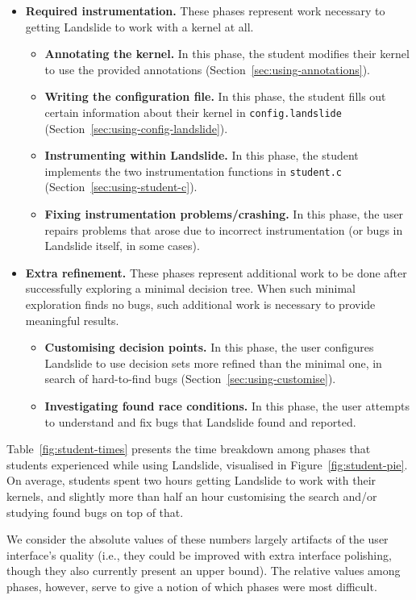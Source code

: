 {\begin{itemize}
	\item {\bf Required instrumentation.} These phases represent work necessary to getting Landslide to work with a kernel at all.
	\begin{itemize}
		\item {\bf Annotating the kernel.} In this phase, the student modifies their kernel to use the provided annotations (Section~\ref{sec:using-annotations}).
		\item {\bf Writing the configuration file.} In this phase, the student fills out certain information about their kernel in \texttt{config.landslide} (Section~\ref{sec:using-config-landslide}).
		\item {\bf Instrumenting within Landslide.} In this phase, the student implements the two instrumentation functions in \texttt{student.c} (Section~\ref{sec:using-student-c}).
		\item {\bf Fixing instrumentation problems/crashing.} In this phase, the user repairs problems that arose due to incorrect instrumentation (or bugs in Landslide itself, in some cases).
	\end{itemize}
	\item {\bf Extra refinement.} These phases represent additional work to be done after successfully exploring a minimal decision tree. When such minimal exploration finds no bugs, such additional work is necessary to provide meaningful results.
	\begin{itemize}
		\item {\bf Customising decision points.} In this phase, the user configures Landslide to use decision sets more refined than the minimal one, in search of hard-to-find bugs (Section~\ref{sec:using-customise}).
		\item {\bf Investigating found race conditions.} In this phase, the user attempts to understand and fix bugs that Landslide found and reported.
	\end{itemize}
\end{itemize}

Table~\ref{fig:student-times} presents the time breakdown among phases that students experienced while using Landslide, visualised in Figure~\ref{fig:student-pie}. On average, students spent two hours getting Landslide to work with their kernels, and slightly more than half an hour customising the search and/or studying found bugs on top of that.

We consider the absolute values of these numbers largely artifacts of the user interface's quality (i.e., they could be improved with extra interface polishing, though they also currently present an upper bound). The relative values among phases, however, serve to give a notion of which phases were most difficult.

}
